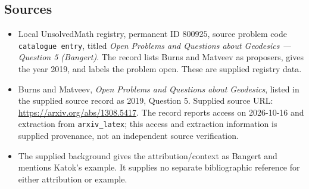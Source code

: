 \documentclass[11pt]{article}
\begin{document}
\subsection{Sources}
\begin{itemize}
\item Local UnsolvedMath registry, permanent ID \(800925\), source problem code \texttt{catalogue entry}, titled \emph{Open Problems and Questions about Geodesics --- Question 5 (Bangert)}. The record lists Burns and Matveev as proposers, gives the year 2019, and labels the problem open. These are supplied registry data.
\item Burns and Matveev, \emph{Open Problems and Questions about Geodesics}, listed in the supplied source record as 2019, Question 5. Supplied source URL: \url{https://arxiv.org/abs/1308.5417}. The record reports access on 2026-10-16 and extraction from \texttt{arxiv\_latex}; this access and extraction information is supplied provenance, not an independent source verification.
\item The supplied background gives the attribution/context as Bangert and mentions Katok's example. It supplies no separate bibliographic reference for either attribution or example.
\end{itemize}
\end{document}
